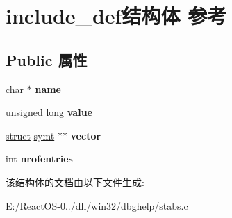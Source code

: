\hypertarget{structinclude__def}{}\section{include\+\_\+def结构体 参考}
\label{structinclude__def}
\subsection*{Public 属性}
\begin{DoxyCompactItemize}
\item 
\mbox{\label{structinclude__def_afc3074d73a7e5f2ffe88ed348ab5c9ba}} 
char $\ast$ {\bfseries name}
\item 
\mbox{\label{structinclude__def_ac142626c614e83eef77fc7f54740bbba}} 
unsigned long {\bfseries value}
\item 
\mbox{\label{structinclude__def_ac580bc8387defea5a16ad1ac32d19f93}} 
\hyperlink{interfacestruct}{struct} \hyperlink{structsymt}{symt} $\ast$$\ast$ {\bfseries vector}
\item 
\mbox{\label{structinclude__def_ab566bd0792a305ca94f57ac5c7b75968}} 
int {\bfseries nrofentries}
\end{DoxyCompactItemize}


该结构体的文档由以下文件生成\+:\begin{DoxyCompactItemize}
\item 
E\+:/\+React\+O\+S-\/0../dll/win32/dbghelp/stabs.\+c\end{DoxyCompactItemize}
